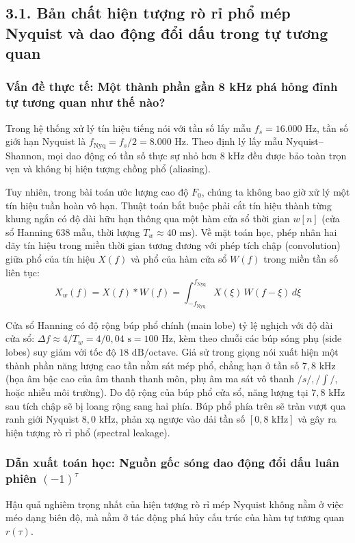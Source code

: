 \subsection*{3.1. Bản chất hiện tượng rò rỉ phổ mép Nyquist và dao động đổi dấu trong tự tương quan}

\subsubsection*{Vấn đề thực tế: Một thành phần gần 8 kHz phá hỏng đỉnh tự tương quan như thế nào?}
Trong hệ thống xử lý tín hiệu tiếng nói với tần số lấy mẫu $f_s = 16.000\text{ Hz}$, tần số giới hạn Nyquist là $f_{\text{Nyq}} = f_s / 2 = 8.000\text{ Hz}$. Theo định lý lấy mẫu Nyquist--Shannon, mọi dao động có tần số thực sự nhỏ hơn $8\text{ kHz}$ đều được bảo toàn trọn vẹn và không bị hiện tượng chồng phổ (aliasing).

Tuy nhiên, trong bài toán ước lượng cao độ $F_0$, chúng ta không bao giờ xử lý một tín hiệu tuần hoàn vô hạn. Thuật toán bắt buộc phải cắt tín hiệu thành từng khung ngắn có độ dài hữu hạn thông qua một hàm cửa sổ thời gian $w[n]$ (cửa sổ Hanning 638 mẫu, thời lượng $T_w \approx 40\text{ ms}$). Về mặt toán học, phép nhân hai dãy tín hiệu trong miền thời gian tương đương với phép tích chập (convolution) giữa phổ của tín hiệu $X(f)$ và phổ của hàm cửa sổ $W(f)$ trong miền tần số liên tục:
\begin{equation}
X_w(f) = X(f) * W(f) = \int_{-f_{\text{Nyq}}}^{f_{\text{Nyq}}} X(\xi) \, W(f - \xi) \, d\xi
\end{equation}

Cửa sổ Hanning có độ rộng búp phổ chính (main lobe) tỷ lệ nghịch với độ dài cửa sổ: $\Delta f \approx 4 / T_w = 4 / 0{,}04\text{ s} = 100\text{ Hz}$, kèm theo chuỗi các búp sóng phụ (side lobes) suy giảm với tốc độ $18\text{ dB/octave}$. Giả sử trong giọng nói xuất hiện một thành phần năng lượng cao tần nằm sát mép phổ, chẳng hạn ở tần số $7{,}8\text{ kHz}$ (họa âm bậc cao của âm thanh thanh môn, phụ âm ma sát vô thanh $/s/, /\int/$, hoặc nhiễu môi trường). Do độ rộng của búp phổ cửa sổ, năng lượng tại $7{,}8\text{ kHz}$ sau tích chập sẽ bị loang rộng sang hai phía. Búp phổ phía trên sẽ tràn vượt qua ranh giới Nyquist $8{,}0\text{ kHz}$, phản xạ ngược vào dải tần số $[0, 8\text{ kHz}]$ và gây ra hiện tượng rò rỉ phổ (spectral leakage).

\subsubsection*{Dẫn xuất toán học: Nguồn gốc sóng dao động đổi dấu luân phiên $(-1)^\tau$}
Hậu quả nghiêm trọng nhất của hiện tượng rò rỉ mép Nyquist không nằm ở việc méo dạng biên độ, mà nằm ở tác động phá hủy cấu trúc của hàm tự tương quan $r(\tau)$.

